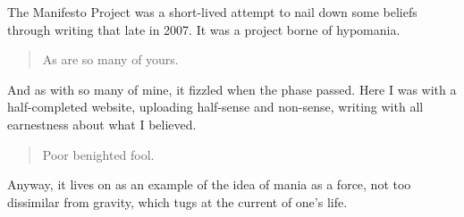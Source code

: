 The Manifesto Project was a short-lived attempt to nail down some beliefs through writing that late in 2007. It was a project borne of hypomania.

\begin{quote}
As are so many of yours.
\end{quote}

And as with so many of mine, it fizzled when the phase passed. Here I was with a half-completed website, uploading half-sense and non-sense, writing with all earnestness about what I believed.

\begin{quote}
Poor benighted fool.
\end{quote}

Anyway, it lives on as an example of the idea of mania as a force, not too dissimilar from gravity, which tugs at the current of one's life.
